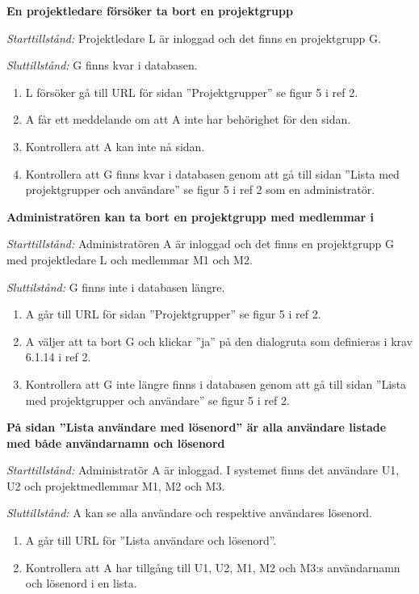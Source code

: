 \documentclass[a4paper]{article}
\begin{document}
\begin{FT}
\item %
\textbf{En projektledare försöker ta bort en projektgrupp}

\emph{Starttillstånd:} Projektledare L är inloggad och det finns en projektgrupp G.

\emph{Sluttillstånd:} G finns kvar i databasen.

\begin{enumerate}
\item L försöker gå till URL för sidan ''Projektgrupper'' se figur 5 i ref 2.
\item A får ett meddelande om att A inte har behörighet för den sidan.
\item Kontrollera att A kan inte nå sidan.
\item Kontrollera att G finns kvar i databasen genom att gå till sidan ''Lista med projektgrupper och användare'' se figur 5 i ref 2 som en administratör.
\end{enumerate}

\item
\textbf{Administratören kan ta bort en projektgrupp med medlemmar i}

\emph{Starttillstånd:} Administratören A är inloggad och det finns en projektgrupp G med projektledare L och medlemmar M1 och M2.

\emph{Sluttilstånd:} G finns inte i databasen längre.

\begin{enumerate}
\item A går till URL för sidan ''Projektgrupper'' se figur 5 i ref 2. 
\item A väljer att ta bort G och klickar ''ja'' på den dialogruta som definieras i krav  6.1.14 i ref 2.
\item Kontrollera att G inte längre finns i databasen genom att gå till sidan ''Lista med projektgrupper och användare'' se figur 5 i ref 2.
\end{enumerate}

\item %
\textbf{På sidan ''Lista användare med lösenord'' är alla användare listade med både användarnamn och lösenord}

\emph{Starttillstånd:} Administratör A är inloggad. I systemet finns det användare U1, U2 och projektmedlemmar M1, M2 och M3.

\emph{Sluttillstånd:} A kan se alla användare och respektive användares lösenord.

\begin{enumerate}
\item A går till URL för ''Lista användare och lösenord''. 
\item Kontrollera att A har tillgång till U1, U2, M1, M2 och M3:s användarnamn och lösenord i en lista.
\end{enumerate}


\end{FT}
\end{document}
